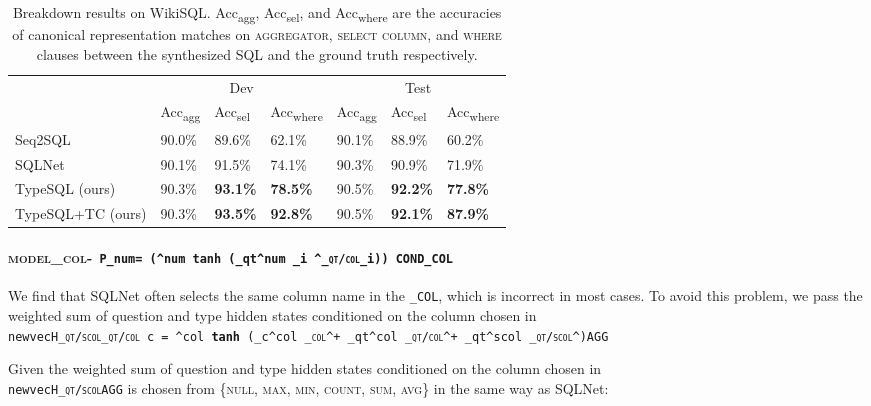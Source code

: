 \documentclass[11pt,a4paper]{article}
\newcommand{\newvec}[1]{\mathbf{#1}}
\DeclareMathOperator{\softmax}{\textbf{softmax}}
\begin{document}
{{{\begin{table*}[!ht]
\centering
\begin{tabular}{|l|l|l|l|l|l|l|}
\hline
\multirow{2}{*}{} & \multicolumn{3}{c|}{Dev} & \multicolumn{3}{c|}{Test} \\ \cline{2-7} 
                  & Acc\textsubscript{agg} & Acc\textsubscript{sel} & Acc\textsubscript{where} & Acc\textsubscript{agg} & Acc\textsubscript{sel} & Acc\textsubscript{where} \\ \hline
Seq2SQL \cite{Zhong2017} & 90.0\% & 89.6\% & 62.1\% & 90.1\% & 88.9\% & 60.2\% \\ \hline
SQLNet \cite{Xu2017} & 90.1\% & 91.5\% & 74.1\% & 90.3\% & 90.9\% & 71.9\% \\ \hline
TypeSQL (ours) & 90.3\% & \textbf{93.1\%} & \textbf{78.5\%} & 90.5\% & \textbf{92.2\%} & \textbf{77.8\%} \\ \hline
\hline
TypeSQL+TC (ours) & 90.3\% & \textbf{93.5\%} & \textbf{92.8\%} & 90.5\% & \textbf{92.1\%} & \textbf{87.9\%} \\ \hline
\end{tabular}
\caption{Breakdown results on WikiSQL. Acc\textsubscript{agg}, Acc\textsubscript{sel}, and Acc\textsubscript{where} are the accuracies of canonical representation matches on \textsc{aggregator}, \textsc{select column}, and \textsc{where} clauses between the synthesized SQL and the ground truth respectively.}
\label{tb:bkd_results}
\end{table*}



%
 \paragraph{\textsc{model\_col}-\texttt{\
P_{num}= \softmax \left(\newvec{V}^{num} \textbf{tanh} (\newvec{W}_{qt}^{num} \sum_{i} \newvec{H}^\top_{\textsc{qt/col}_i})\right)
COND\_COL}}
We find that SQLNet often selects the same column name in the \texttt{\SELECT\_COL}, which is incorrect in most cases. To avoid this problem, we pass the weighted sum of question and type hidden states conditioned on the column chosen in \texttt{\\newvec{H}_{\textsc{qt/scol}}\newvec{H}_{\textsc{qt/col}}
c = \newvec{V}^{col} \textbf{tanh} (\newvec{W}_{c}^{col} \newvec{H}_{\textsc{col}}^\top + \newvec{W}_{qt}^{col} \newvec{H}_{\textsc{qt/col}}^\top + \newvec{W}_{qt}^{scol} \newvec{H}_{\textsc{qt/scol}}^\top)AGG}}
Given the weighted sum of question and type hidden states conditioned on the column chosen in \texttt{\\newvec{H}_{\textsc{qt/scol}}AGG} is chosen from \{\textsc{null}, \textsc{max}, \textsc{min}, \textsc{count}, \textsc{sum}, \textsc{avg}\} in the same way as SQLNet:

}}
\end{document}
